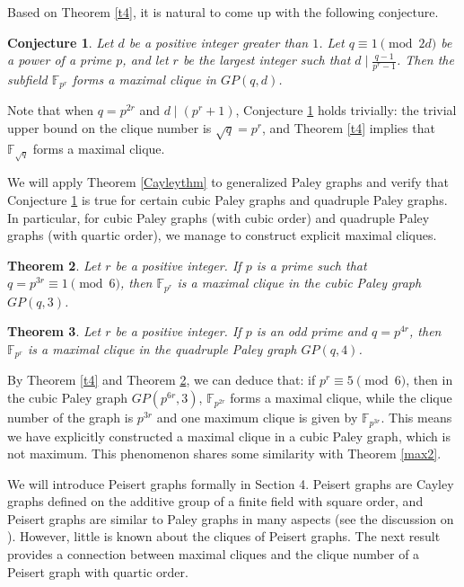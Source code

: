 \documentclass[12pt,oneside]{amsart}
\newtheorem{thm}{Theorem}[section]
\newtheorem{conj}[thm]{Conjecture}
\newcommand{\F}{\mathbb{F}}
\begin{document}
Based on Theorem \ref{t4}, it is natural to come up with the following conjecture. 

\begin{conj}\label{maxconj}
Let $d$ be a positive integer greater than $1$. Let $q \equiv 1 \pmod {2d}$ be a power of a prime $p$, and let $r$ be the largest integer such that $d \mid \frac{q-1}{p^r-1}$. Then the subfield $\F_{p^r}$ forms a maximal clique in $GP(q,d)$.
\end{conj}

Note that when $q=p^{2r}$ and $d \mid (p^r+1)$, Conjecture \ref{maxconj} holds trivially: the trivial upper bound on the clique number is $\sqrt{q}=p^r$, and Theorem \ref{t4} implies that $\F_{\sqrt{q}}$ forms a maximal clique.

We will apply Theorem \ref{Cayleythm} to generalized Paley graphs and verify that Conjecture \ref{maxconj} is true for certain cubic Paley graphs and quadruple Paley graphs. In particular, for cubic Paley graphs (with cubic order) and quadruple Paley graphs (with quartic order), we manage to construct explicit maximal cliques. 

\begin{thm}\label{max3}
Let $r$ be a positive integer. If $p$ is a prime such that $q=p^{3r} \equiv 1 \pmod 6$, then $\F_{p^r}$ is a maximal clique in the cubic Paley graph $GP(q,3)$.
\end{thm}

\begin{thm}\label{max4}
Let $r$ be a positive integer. If $p$ is an odd prime and $q=p^{4r}$, then $\F_{p^r}$ is a maximal clique in the quadruple Paley graph $GP(q,4)$.
\end{thm}

By Theorem \ref{t4} and Theorem \ref{max3}, we can deduce that: if $p^r \equiv 5 \pmod 6$, then in the cubic Paley graph $GP(p^{6r},3)$, $\F_{p^{2r}}$ forms a maximal clique, while the clique number of the graph is $p^{3r}$ and one maximum clique is given by $\F_{p^{3r}}$. This means we have explicitly constructed a maximal clique in a cubic Paley graph, which is not maximum. This phenomenon shares some similarity with Theorem \ref{max2}.

We will introduce Peisert graphs formally in Section 4. Peisert graphs are Cayley graphs defined on the additive group of a finite field with square order, and Peisert graphs are similar to Paley graphs in many aspects (see the discussion on \cite{KP}). However, little is known about the cliques of Peisert graphs. The next result provides a connection between maximal cliques and the clique number of a Peisert graph with quartic order.
\end{document}
